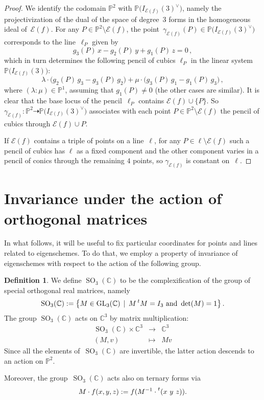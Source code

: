 \documentclass[a4paper, 11pt, reqno]{amsart}
\theoremstyle{plain}
\theoremstyle{definition}
\newtheorem{definition}[lemma]{Definition}
\newcommand{\C}{\mathbb{C}}
\newcommand{\p}{\mathbb{P}}
\newcommand{\SO}{\operatorname{SO}}
\newcommand{\Eig}[1]{\mathcal{E}\!\left( {#1} \right)}
\begin{document}
\begin{proof}
We identify the codomain $\p^2$ with $\p\bigl(I_{\Eig{f}}(3)^{\vee}\bigr)$, namely the projectivization of the dual of the space of degree~$3$ forms in the homogeneous ideal of~$\Eig{f}$.
For any $P \in \p^2 \setminus \Eig{f}$, the point~$\gamma_{\Eig{f}} (P)\in \p \bigl(I_{\Eig{f}}(3)^{\vee}\bigr)$ corresponds to the line~$\ell_P$ given by
\[
  g_3 (P) \, x - g_2(P) \, y + g_1(P) \, z = 0 \,,
\]
%
which in turn determines the following
pencil of cubics $\ell_P$ in the linear system $\p \bigl(I_{\Eig{f}}(3)\bigr)$:
%
\[
  \lambda \cdot \bigl( g_2(P) \, g_3  -g_3(P) \, g_2\bigr) + \mu \cdot \bigl( g_3(P) \, g_1 - g_1(P) \, g_3 \bigr) \,,
\]
%
where $(\lambda : \mu) \in \p^1$, assuming that $g_1(P) \neq 0$ (the other cases are similar).
It is clear that the base locus of the pencil~$\ell_P$ contains $\Eig{f} \cup \{P\}$.
So $\gamma_{\Eig{f}} \colon \p^2 \dasharrow \p \bigl( I_{\Eig{f}}(3)^\vee \bigr)$
associates with each point $P \in \p^2 \setminus \Eig{f}$ the pencil of cubics through $\Eig{f} \cup P$.

If $\Eig{f}$ contains a triple of points on a line~$\ell$, for any $P \in \ell \setminus \Eig{f}$ such a pencil of cubics has $\ell$ as a fixed component and the other component varies in a pencil of conics through the remaining $4$ points, so $\gamma_{\Eig{f}}$ is constant on~$\ell$.
\end{proof}


\section{Invariance under the action of orthogonal matrices}
\label{invariance}

In what follows, it will be useful to fix particular coordinates for points and lines related to eigenschemes.
To do that, we employ a property of invariance of eigenschemes with respect to the action of the following group.

\begin{definition}
We define $\SO_3(\C)$ to be the complexification of the group of special orthogonal real matrices, namely
%
\[
  \SO_3(\C) :=
  \bigl\{
    M \in \mathrm{GL}_3(\C) \, \mid \,
    M \prescript{t} {}M = I_3 \ \text{and} \ \det(M) = 1
  \bigr\} \,.
\]
%
The group $\SO_3(\C)$ acts on $\C^3$ by matrix multiplication:
%
\[
  \begin{array}{ccc}
    \SO_3(\C) \times \C^3 & \rightarrow & \C^3 \\
    (M, v) & \mapsto & Mv
  \end{array}
\]
%
Since all the elements of~$\SO_3(\C)$ are invertible, the latter action descends to an action on $\p^2$.

Moreover, the group~$\SO_3(\C)$ acts also on ternary forms via
%
\[
  M \cdot f (x,y,z) := f(M^{-1} \cdot \prescript{t} {}( x \ y \ z ) ).
\]
%
\end{definition}
\end{document}
